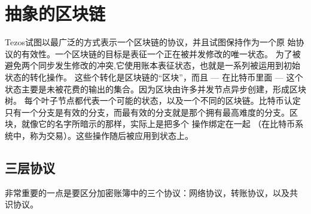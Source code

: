 \documentclass[letterpaper]{article}
\begin{document}
\section{抽象的区块链}

Tezos试图以最广泛的方式表示一个区块链的协议，并且试图保持作为一个原
始协议的有效性。一个区块链的目标是表征一个正在被并发修改的唯一状态。
为了被避免两个同步发生修改的冲突,它使用账本表征状态，也就是一系列被运用到初始状态的转化操作。
这些个转化是区块链的``区块''，而且 --- 在比特币里面 --- 这个状态主要是未被花费的输出的集合。因为区块由许多并发节点异步创建，形成区块树。
每个叶子节点都代表一个可能的状态，以及一个不同的区块链。比特币认定只有一个分支是有效的分支，而最有效的分支就是那个拥有最高难度的分支。区块，就像它的名字所暗示的那样，实际上是把多个
操作绑定在一起 （在比特币系统中，称为交易）。这些操作随后被应用到状态上。

\subsection{三层协议}

非常重要的一点是要区分加密账簿中的三个协议：网络协议，转账协议，以及共
识协议。
\end{document}
